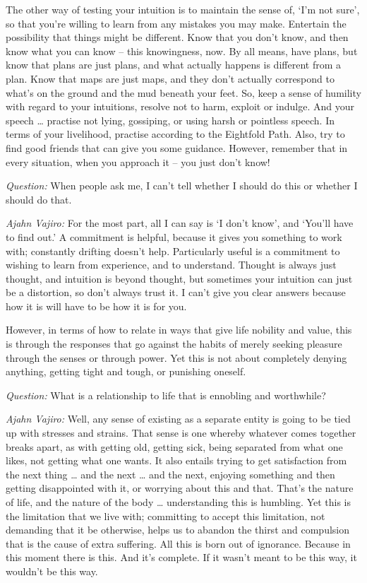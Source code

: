 The other way of testing your intuition is to maintain the sense of, `I'm not
sure', so that you're willing to learn from any mistakes you may make. Entertain
the possibility that things might be different. Know that you don't know, and
then know what you can know -- this knowingness, now. By all means, have plans,
but know that plans are just plans, and what actually happens is different from
a plan. Know that maps are just maps, and they don't actually correspond to
what's on the ground and the mud beneath your feet. So, keep a sense of humility
with regard to your intuitions, resolve not to harm, exploit or indulge. And
your speech \ldots{} practise not lying, gossiping, or using harsh or pointless
speech. In terms of your livelihood, practise according to the Eightfold Path.
Also, try to find good friends that can give you some guidance. However,
remember that in every situation, when you approach it -- you just don't know!

\bigskip

\emph{Question:} When people ask me, I can't tell whether I should do this or whether I
should do that.

\emph{Ajahn Vajiro:} For the most part, all I can say is `I don't know', and `You'll
have to find out.' A commitment is helpful, because it gives you something to
work with; constantly drifting doesn't help. Particularly useful is a commitment
to wishing to learn from experience, and to understand. Thought is always just
thought, and intuition is beyond thought, but sometimes your intuition can just
be a distortion, so don't always trust it. I can't give you clear answers
because how it is will have to be how it is for you.

However, in terms of how to relate in ways that give life nobility and value,
this is through the responses that go against the habits of merely seeking
pleasure through the senses or through power. Yet this is not about completely
denying anything, getting tight and tough, or punishing oneself.

\bigskip

\emph{Question:} What is a relationship to life that is ennobling and worthwhile?

\emph{Ajahn Vajiro:} Well, any sense of existing as a separate entity is going to be
tied up with stresses and strains. That sense is one whereby whatever comes
together breaks apart, as with getting old, getting sick, being separated from
what one likes, not getting what one wants. It also entails trying to get
satisfaction from the next thing \ldots{} and the next \ldots{} and the next,
enjoying something and then getting disappointed with it, or worrying about this
and that. That's the nature of life, and the nature of the body \ldots{}
understanding this is humbling. Yet this is the limitation that we live with;
committing to accept this limitation, not demanding that it be otherwise, helps
us to abandon the thirst and compulsion that is the cause of extra suffering.
All this is born out of ignorance. Because in this moment there is this. And
it's complete. If it wasn't meant to be this way, it wouldn't be this way.

